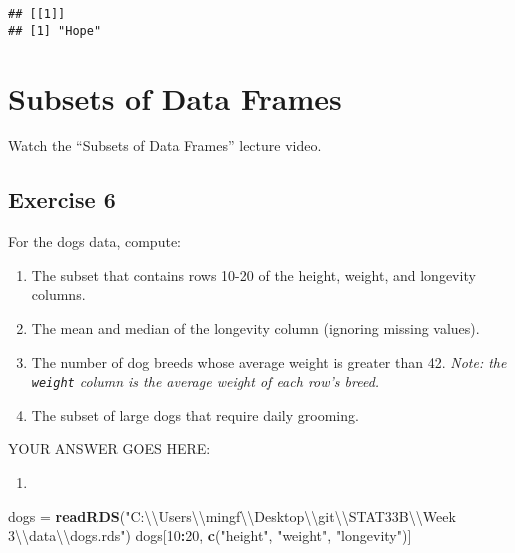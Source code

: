 \documentclass[
]{article}
\newenvironment{Shaded}{\begin{snugshade}}{\end{snugshade}}
\newcommand{\CharTok}[1]{\textcolor[rgb]{0.31,0.60,0.02}{#1}}
\newcommand{\DecValTok}[1]{\textcolor[rgb]{0.00,0.00,0.81}{#1}}
\newcommand{\KeywordTok}[1]{\textcolor[rgb]{0.13,0.29,0.53}{\textbf{#1}}}
\newcommand{\NormalTok}[1]{#1}
\newcommand{\OperatorTok}[1]{\textcolor[rgb]{0.81,0.36,0.00}{\textbf{#1}}}
\newcommand{\StringTok}[1]{\textcolor[rgb]{0.31,0.60,0.02}{#1}}
\providecommand{\tightlist}{%
  \setlength{\itemsep}{0pt}\setlength{\parskip}{0pt}}
\begin{document}
\begin{verbatim}
## [[1]]
## [1] "Hope"
\end{verbatim}

\hypertarget{subsets-of-data-frames}{%
\section{Subsets of Data Frames}\label{subsets-of-data-frames}}

Watch the ``Subsets of Data Frames'' lecture video.

\hypertarget{exercise-6}{%
\subsection{Exercise 6}\label{exercise-6}}

For the dogs data, compute:

\begin{enumerate}
\def\labelenumi{\arabic{enumi}.}
\item
  The subset that contains rows 10-20 of the height, weight, and
  longevity columns.
\item
  The mean and median of the longevity column (ignoring missing values).
\item
  The number of dog breeds whose average weight is greater than 42.
  \emph{Note: the \texttt{weight} column is the average weight of each
  row's breed.}
\item
  The subset of large dogs that require daily grooming.
\end{enumerate}

YOUR ANSWER GOES HERE:

\begin{enumerate}
\def\labelenumi{\arabic{enumi}.}
\tightlist
\item
\end{enumerate}

\begin{Shaded}
\begin{Highlighting}[]
\NormalTok{dogs =}\StringTok{ }\KeywordTok{readRDS}\NormalTok{(}\StringTok{"C:}\CharTok{\textbackslash{}\textbackslash{}}\StringTok{Users}\CharTok{\textbackslash{}\textbackslash{}}\StringTok{mingf}\CharTok{\textbackslash{}\textbackslash{}}\StringTok{Desktop}\CharTok{\textbackslash{}\textbackslash{}}\StringTok{git}\CharTok{\textbackslash{}\textbackslash{}}\StringTok{STAT33B}\CharTok{\textbackslash{}\textbackslash{}}\StringTok{Week 3}\CharTok{\textbackslash{}\textbackslash{}}\StringTok{data}\CharTok{\textbackslash{}\textbackslash{}}\StringTok{dogs.rds"}\NormalTok{)}
\NormalTok{dogs[}\DecValTok{10}\OperatorTok{:}\DecValTok{20}\NormalTok{, }\KeywordTok{c}\NormalTok{(}\StringTok{"height"}\NormalTok{, }\StringTok{"weight"}\NormalTok{, }\StringTok{"longevity"}\NormalTok{)]}
\end{Highlighting}
\end{Shaded}
\end{document}
